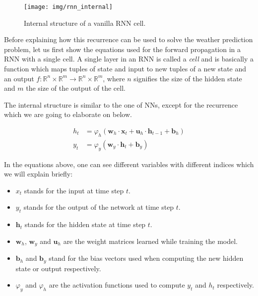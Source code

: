 \begin{figure}[h]
	\centering
	\texttt{[image: img/rnn\_internal]}
	\caption{Internal structure of a vanilla RNN cell.\protect\footnotemark}
	\label{fundamentals:rnn:internal_structure}
\end{figure}

Before explaining how this recurrence can be used to solve the weather prediction problem, let us first show the equations used for the forward propagation in a RNN with a single cell. A single layer in an RNN is called a \emph{cell} and is basically a function which maps tuples of state and input to new tuples of a new state and an output $f\colon \mathbb{R}^n \times \mathbb{R}^m \rightarrow \mathbb{R}^n \times \mathbb{R}^m$, where $n$ signifies the size of the hidden state and $m$ the size of the output of the cell.

The internal structure is similar to the one of NNs, except for the recurrence which we are going to elaborate on below.

\begin{equation}
\begin{split}
h_t & = \varphi_h(\mathbf{w}_h \cdot \mathbf{x}_t + \mathbf{u}_h \cdot \mathbf{h}_{t-1} + \mathbf{b}_h) \\
y_t & = \varphi_y(\mathbf{w}_y \cdot \mathbf{h}_t + \mathbf{b}_y)
\end{split}
\label{fundamentals:rnn:forward_equation:hidden}
\end{equation}

In the equations above, one can see different variables with different indices which we will explain briefly:

\begin{itemize}[noitemsep]
	\item $x_t$ stands for the input at time step $t$.
	\item $y_t$ stands for the output of the network at time step $t$.
	\item $\mathbf{h}_t$ stands for the hidden state at time step $t$.
	\item $\mathbf{w}_h$, $\mathbf{w}_y$ and $\mathbf{u}_h$ are the weight matrices learned while training the model.
	\item $\mathbf{b}_h$ and $\mathbf{b}_y$ stand for the bias vectors used when computing the new hidden state or output respectively.
	\item $\varphi_y$ and $\varphi_h$ are the activation functions used to compute $y_t$ and $h_t$ respectively.
\end{itemize}

